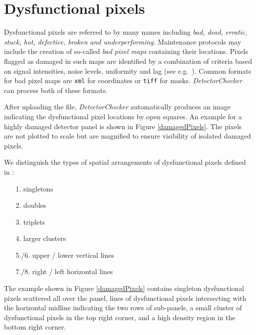 \documentclass[11pt,a4paper]{article}
\newcommand{\DetectorChecker}{\emph{DetectorChecker}\xspace}
\begin{document}
\section{Dysfunctional pixels}\label{dysfct}

Dysfunctional pixels are referred to by many names including \emph{bad, dead, erratic, stuck, hot, defective, broken and underperforming.} Maintenance protocols may include the creation of so-called \emph{bad pixel maps} containing their locations.
Pixels flagged as damaged in such maps
are identified by a combination of criteria based on signal intensities, noise levels, uniformity and lag
(see e.g.~\cite{manualXRD1621}). 
Common formats for bad pixel maps are \texttt{xml} for coordinates or \texttt{tiff} for masks. 
\DetectorChecker can process both of these formats.

After uploading the file, \DetectorChecker automatically produces an image indicating the dysfunctional pixel locations 
by open squares. An example for a highly damaged detector panel is shown in Figure \ref{damagedPixels}.
The pixels are not plotted to scale but are magnified to ensure visibility of isolated damaged pixels.

We distinguish the types of spatial arrangements of dysfunctional pixels defined in \cite{brettschneider2014crism}:
\begin{itemize}
\item[1.] singletons
\item[2.] doubles
\item[3.] triplets
\item[4.] larger clusters
\item[5./6.] upper / lower vertical lines
\item[7./8.] right / left horizontal lines
\end{itemize} 
The example shown in Figure \ref{damagedPixels} 
contains singleton dysfunctional pixels 
scattered all over the panel, 
lines of dysfunctional pixels intersecting with the horizontal midline indicating the two rows of sub-panels, a small cluster of dysfunctional pixels in the top right corner, and a high density region in the bottom right corner. 
\end{document}
